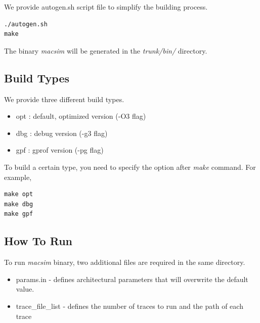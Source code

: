 \noindent
We provide autogen.sh script file to simplify the building process.

\begin{Verbatim}
./autogen.sh
make
\end{Verbatim}

The binary \textit{macsim} will be generated in the
\textit{trunk/bin/} directory.





\subsection{Build Types}

We provide three different build types.

\begin{itemize}
  \item opt : default, optimized version (-O3 flag)
  \item dbg : debug version (-g3 flag)
  \item gpf : gprof version (-pg flag)
\end{itemize}

\noindent
To build a certain type, you need to specify the option
after \textit{make} command. For example,

\begin{Verbatim}
make opt
make dbg
make gpf
\end{Verbatim}





\subsection{How To Run \SIM}

To run \textit{macsim} binary, two additional files are required in
the same directory.

\begin{itemize}
  \item params.in - defines architectural parameters that will
  overwrite the default value.

  \item trace\_file\_list - defines the number of traces to run and
  the path of each trace
\end{itemize}

